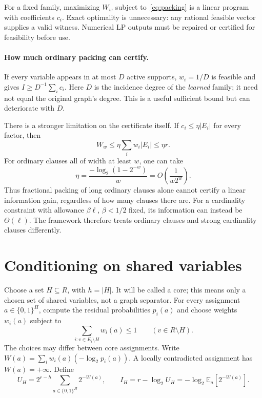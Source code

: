 \documentclass[11pt,a4paper]{article}
\theoremstyle{definition}
\theoremstyle{remark}
\newcommand{\E}{\mathbb E}
\begin{document}
For a fixed family, maximizing $W_w$ subject to~\eqref{eq:packing} is a
linear program with coefficients $c_i$. Exact optimality is unnecessary:
any rational feasible vector supplies a valid witness. Numerical LP
outputs must be repaired or certified for feasibility before use.

\paragraph{How much ordinary packing can certify.}
If every variable appears in at most $D$ active supports, $w_i=1/D$ is
feasible and gives $I\ge D^{-1}\sum_i c_i$. Here $D$ is the incidence
degree of the \emph{learned} family; it need not equal the original graph's
degree. This is a useful sufficient bound but can deteriorate with $D$.

There is a stronger limitation on the certificate itself. If
$c_i\le\eta|E_i|$ for every factor, then
\begin{equation}
 W_w\le\eta\sum_iw_i|E_i|\le\eta r.                 \label{eq:efficiency}
\end{equation}
For ordinary clauses all of width at least $w$, one can take
\[
 \eta=\frac{-\log_2(1-2^{-w})}{w}=O\!\left(\frac1{w2^w}\right).
\]
Thus fractional packing of long ordinary clauses alone cannot certify a
linear information gain, regardless of how many clauses there are.
For a cardinality constraint with allowance $\beta\ell$, $\beta<1/2$
fixed, its information can instead be $\Theta(\ell)$. The framework
therefore treats ordinary clauses and strong cardinality clauses differently.

\section{Conditioning on shared variables}

Choose a set $H\subseteq R$, with $h=|H|$. It will be called a core;
this means only a chosen set of shared variables, not a graph separator.
For every assignment $a\in\{0,1\}^H$, compute the residual probabilities
$p_i(a)$ and choose weights $w_i(a)$ subject to
\[
 \sum_{i:v\in E_i\setminus H}w_i(a)\le1
 \qquad(v\in R\setminus H).
\]
The choices may differ between core assignments. Write
$W(a)=\sum_iw_i(a)(-\log_2p_i(a))$. A locally contradicted assignment
has $W(a)=+\infty$. Define
\begin{equation}
 U_H=2^{r-h}\sum_{a\in\{0,1\}^H}2^{-W(a)},\qquad
 I_H=r-\log_2U_H
     =-\log_2\E_a[2^{-W(a)}].                         \label{eq:core}
\end{equation}
\end{document}
